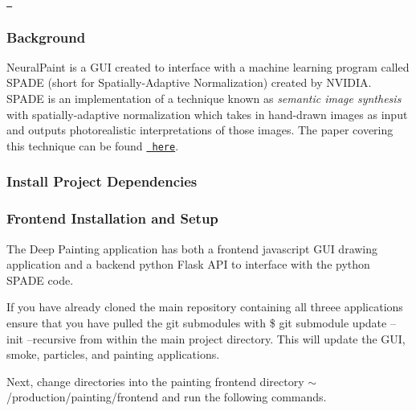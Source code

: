 \href{http://www.youtube.com/watch?v=p5U4NgVGAwg}{\texttt{ }}

\subsubsection*{Background}

Neural\+Paint is a G\+UI created to interface with a machine learning program called S\+P\+A\+DE (short for Spatially-\/\+Adaptive Normalization) created by N\+V\+I\+D\+IA. S\+P\+A\+DE is an implementation of a technique known as {\itshape semantic image synthesis} with spatially-\/adaptive normalization which takes in hand-\/drawn images as input and outputs photorealistic interpretations of those images. The paper covering this technique can be found \href{https://nvlabs.github.io/SPADE/}{\texttt{ here}}.

\subsubsection*{Install Project Dependencies}


\begin{DoxyCode}{0}
\end{DoxyCode}


\subsubsection*{Frontend Installation and Setup}

The Deep Painting application has both a frontend javascript G\+UI drawing application and a backend python Flask A\+PI to interface with the python S\+P\+A\+DE code.

If you have already cloned the main repository containing all threee applications ensure that you have pulled the git submodules with \textquotesingle{}\$ git submodule update --init --recursive\textquotesingle{} from within the main project directory. This will update the G\+UI, smoke, particles, and painting applications.

Next, change directories into the painting frontend directory {\ttfamily $\sim$/production/painting/frontend} and run the following commands.


\begin{DoxyCode}{0}
\DoxyCodeLine{}
\DoxyCodeLine{}
\DoxyCodeLine{}
\DoxyCodeLine{}
\end{DoxyCode}


